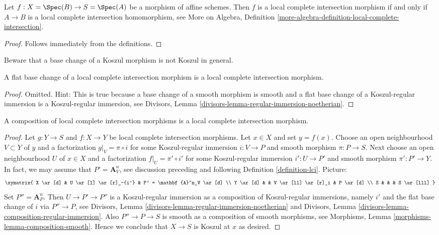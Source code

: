 \begin{lemma}
\label{lemma-affine-lci}
Let $f : X = \Spec(B) \to S = \Spec(A)$ be a morphism of affine schemes.
Then $f$ is a local complete intersection morphism if and only if
$A \to B$ is a local complete intersection homomorphism, see
More on Algebra, Definition
\ref{more-algebra-definition-local-complete-intersection}.
\end{lemma}

\begin{proof}
Follows immediately from the definitions.
\end{proof}

\noindent
Beware that a base change of a Koszul morphism is not
Koszul in general.

\begin{lemma}
\label{lemma-flat-base-change-lci}
A flat base change of a local complete intersection morphism is a
local complete intersection morphism.
\end{lemma}

\begin{proof}
Omitted. Hint: This is true because a base change of a smooth morphism
is smooth and a flat base change of a Koszul-regular immersion is a
Koszul-regular immersion, see
Divisors, Lemma \ref{divisors-lemma-regular-immersion-noetherian}.
\end{proof}

\begin{lemma}
\label{lemma-composition-lci}
A composition of local complete intersection morphisms
is a local complete intersection morphism.
\end{lemma}

\begin{proof}
Let $g : Y \to S$ and $f : X \to Y$ be local complete intersection
morphisms. Let $x \in X$ and set $y = f(x)$. Choose an open neighbourhood
$V \subset Y$ of $y$ and a factorization $g|_V = \pi \circ i$ for some
Koszul-regular immersion $i : V \to P$ and smooth morphism $\pi : P \to S$.
Next choose an open neighbourhood $U$ of $x \in X$ and a factorization
$f|_U = \pi' \circ i'$ for some Koszul-regular immersion $i' : U \to P'$
and smooth morphism $\pi' : P' \to Y$. In fact, we may assume that
$P' = \mathbf{A}^n_V$, see discussion preceding and following
Definition \ref{definition-lci}. Picture:
$$
\xymatrix{
X \ar[d] & U \ar[l] \ar[r]_-{i'} & P' = \mathbf{A}^n_V \ar[d] \\
Y \ar[d] &  & V \ar[ll] \ar[r]_i & P \ar[d] \\
S & & & S \ar[lll]
}
$$
Set $P'' = \mathbf{A}^n_P$. Then $U \to P' \to P''$ is a
Koszul-regular immersion as a composition
of Koszul-regular immersions, namely $i'$ and the flat base change of
$i$ via $P'' \to P$, see
Divisors,
Lemma \ref{divisors-lemma-regular-immersion-noetherian}
and
Divisors, Lemma \ref{divisors-lemma-composition-regular-immersion}.
Also $P'' \to P \to S$ is smooth as a composition of smooth morphisms,
see
Morphisms, Lemma \ref{morphisms-lemma-composition-smooth}.
Hence we conclude that $X \to S$ is Koszul at $x$ as desired.
\end{proof}

